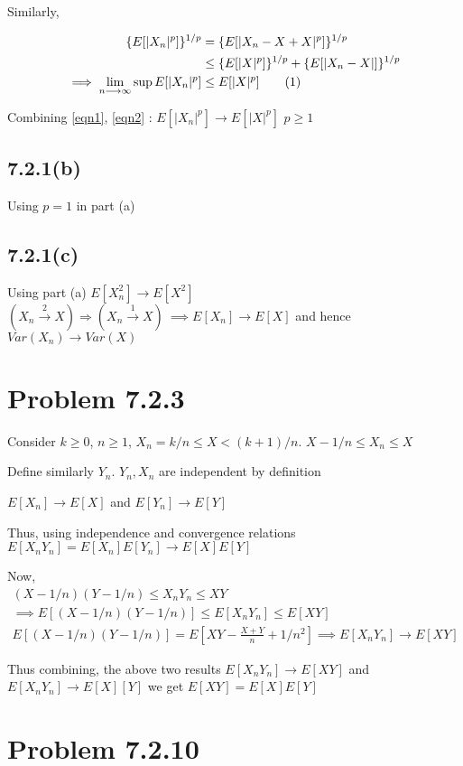 \documentclass[a4paper]{article}
\newcommand\numberthis{\addtocounter{equation}{1}\tag{\theequation}}
\begin{document}
Similarly,

\begin{align*}
\{E[|X_n|^p]\}^{1/p} &= \{E[|X_n-X+X|^p]\}^{1/p}\\
&\leq \{E[|X|^p]\}^{1/p} + \{E[|X_n-X|]\}^{1/p}\\
\implies  \lim_{n \longrightarrow \infty} \sup E[|X_n|^p] &\leq E[|X|^p] \numberthis \label{eqn2}
\end{align*}

Combining \ref{eqn1}, \ref{eqn2} : $E[|X_n|^p] \longrightarrow
E[|X|^p]$ $p \geq 1$

\subsection*{7.2.1(b)}
Using $p=1$ in part (a)
\subsection*{7.2.1(c)}
Using part (a) $E[X_n^2] \longrightarrow E[X^2]$
$(X_n \xrightarrow{2} X) \Rightarrow (X_n \xrightarrow{1} X)\ \implies E[X_n] \longrightarrow E[X]$ and hence $Var(X_n) \longrightarrow Var(X)$

\section*{Problem 7.2.3}

Consider $k \geq 0$, $ n\geq 1$,  $X_n=k/n \leq X < (k+1)/n$. 
$X-1/n \leq X_n \leq X$

Define similarly $Y_n$. $Y_n,X_n$ are independent by definition


$E[X_n] \longrightarrow E[X]$ and $E[Y_n] \longrightarrow E[Y]$

Thus, using independence and convergence relations $E[X_nY_n] = E[X_n]E[Y_n] \longrightarrow E[X]E[Y] $

Now,
\begin{eqnarray*}
(X-1/n)(Y-1/n)\leq X_nY_n \leq XY\\
\implies E[(X-1/n)(Y-1/n)]\leq E[X_nY_n] \leq E[XY]\\
E[(X-1/n)(Y-1/n)] = E[XY-\frac{X+Y}{n}+1/n^2] 
\implies E[X_nY_n] \longrightarrow E[XY]
\end{eqnarray*}

Thus combining, the above two results $E[X_nY_n] \longrightarrow E[XY]$ and $E[X_nY_n] \longrightarrow E[X][Y]$ 
we get $E[XY]=E[X]E[Y]$

\section*{Problem 7.2.10}
\end{document}
